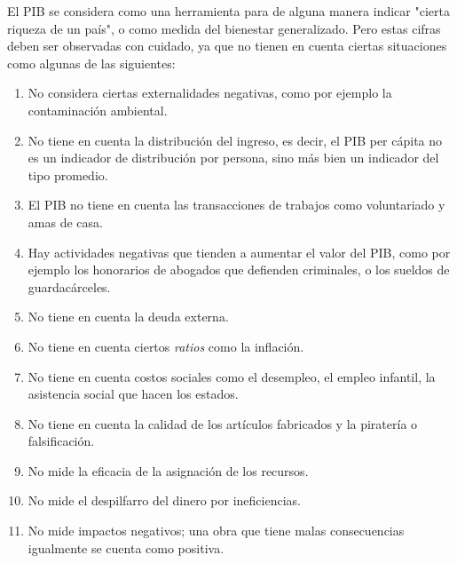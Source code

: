 El PIB se considera como una herramienta para de alguna manera indicar
"cierta riqueza de un país", o como medida del bienestar generalizado.
Pero estas cifras deben ser observadas con cuidado,
ya que no tienen en cuenta ciertas situaciones como algunas de las siguientes:
\begin{enumerate}
    \item No considera ciertas externalidades negativas,
          como por ejemplo la contaminación ambiental.
    \item No tiene en cuenta la distribución del ingreso,
          es decir,
          el PIB per cápita no es un indicador de distribución por persona,
          sino más bien un indicador del tipo promedio.
    \item El PIB no tiene en cuenta las transacciones de trabajos como
          voluntariado y amas de casa.
    \item Hay actividades negativas que tienden a aumentar el valor del PIB,
          como por ejemplo los honorarios de abogados que defienden criminales,
          o los sueldos de guardacárceles.
    \item No tiene en cuenta la deuda externa.
    \item No tiene en cuenta ciertos \textit{ratios} como la inflación.
    \item No tiene en cuenta costos sociales como el desempleo,
          el empleo infantil, la asistencia social que hacen los estados.
    \item No tiene en cuenta la calidad de los artículos fabricados y
          la piratería o falsificación.
    \item No mide la eficacia de la asignación de los recursos.
    \item No mide el despilfarro del dinero por ineficiencias.
    \item No mide impactos negativos; una obra que tiene malas
          consecuencias igualmente se cuenta como positiva.
\end{enumerate}


